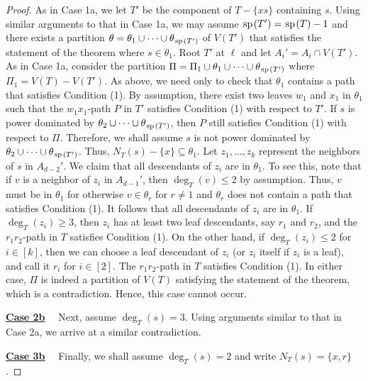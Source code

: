 \documentclass[11pt]{article}
\newcommand{\spider}{\hskip1pt \textrm{sp} \hskip1pt}
\begin{document}
\begin{proof}
\medskip
As in Case 1a, we let $T'$ be the component of $T- \{xs\}$ containing $s$. Using similar arguments to that in Case 1a, we may assume $\spider(T') = \spider(T) -1$ and there exists a partition $\theta = \theta_1 \cup \cdots \cup \theta_{\spider(T')}$ of $V(T')$ that satisfies the statement of the theorem where $s \in \theta_1$. Root $T'$ at $\ell$ and let $A_i' = A_i \cap V(T')$. As in Case 1a, consider the partition $\Pi = \Pi_1 \cup \theta_1 \cup \cdots \cup \theta_{\spider(T')}$ where $\Pi_1 = V(T) - V(T')$. As above, we need only to check that $\theta_1$ contains a path that satisfies Condition (1).  By assumption, there exist two leaves $w_1$ and $x_1$ in $\theta_1$ such that the $w_1x_1$-path $P$ in $T'$ satisfies Condition (1) with respect to $T'$.  If $s$ is power dominated by $\theta_2 \cup \cdots \cup \theta_{\spider(T')}$, then $P$ still satisfies Condition (1) with respect to $\Pi$. Therefore, we shall assume $s$ is not power dominated by $\theta_2 \cup \cdots \cup \theta_{\spider(T')}$. Thus, $N_T(s) - \{x\} \subseteq \theta_1$. Let $z_1, \dots, z_k$ represent the neighbors of $s$ in $A_{d-2}'$. We claim that all descendants of $z_i$ are in $\theta_1$. To see this, note that if $v$ is a neighbor of $z_i$ in $A_{d-1}'$, then $\deg_T(v) \le 2$ by assumption. Thus, $v$ must be in $\theta_1$ for otherwise $v \in \theta_r$ for $r\ne 1$ and $\theta_r$ does not contain a path that satisfies Condition (1). It follows that all descendants of $z_i$ are in $\theta_1$. If $\deg_T(z_i) \ge 3$, then $z_i$ has at least two leaf descendants, say $r_1$ and $r_2$, and the $r_1r_2$-path in $T$ satisfies Condition (1). On the other hand, if $\deg_T(z_i) \le 2$ for $i \in [k]$, then we can choose a leaf descendant of $z_i$ (or $z_i$ itself if $z_i$ is a leaf), and call it $r_i$ for $i \in [2]$. The $r_1r_2$-path in $T$ satisfies Condition (1). In either case, $\Pi$ is indeed a partition of $V(T)$ satisfying the statement of the theorem, which is a contradiction. Hence, this case cannot occur.
\vskip5mm

\noindent\underline{\textbf{Case 2b}} \ \ Next, assume $\deg_T(s) = 3$. Using arguments similar to that in Case 2a, we arrive at a similar contradiction.

\medskip

\noindent\underline{\textbf{Case 3b}} \ \ Finally, we shall assume $\deg_T(s) = 2$ and write $N_T(s) = \{x, r\}$. 
\medskip


\end{proof}
\end{document}

